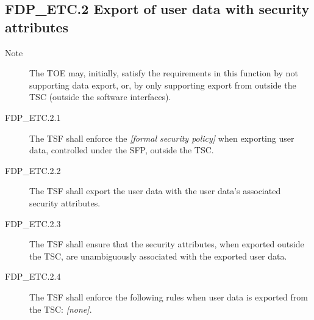 \documentclass[12pt,english]{scrbook}
\begin{document}



\subsection{FDP{\_}ETC.2 Export of user data with security attributes}
\begin{description}
\item[Note]

The TOE may, initially, satisfy the requirements in this
function by not supporting data export, or, by only
supporting export from outside the TSC (outside the
software interfaces).

\item[FDP{\_}ETC.2.1]

The TSF shall enforce the \emph{{[}formal security policy]} when exporting user
data, controlled under the SFP, outside the TSC.

\item[FDP{\_}ETC.2.2]

The TSF shall export the user data with the user data's associated 
security attributes.

\item[FDP{\_}ETC.2.3]

The TSF shall ensure that the security attributes, when 
exported outside the TSC, are unambiguously associated 
with the exported user data.

\item[FDP{\_}ETC.2.4]

The TSF shall enforce the following rules when user data 
is exported from the TSC: \emph{{[}none]}.

\end{description}


\end{document}
